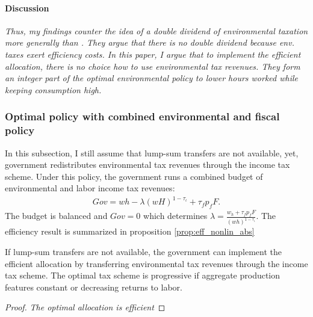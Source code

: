 \paragraph{Discussion}
\textit{Thus, my findings counter the idea of a double dividend of environmental taxation more generally than \cite{LansBovenberg1994EnvironmentalTaxation}. They argue that there is no double dividend because env. taxes exert efficiency costs. In this paper, I argue that to implement the efficient allocation, there is no choice how to use environmental tax revenues. They form an integer part of the optimal environmental policy to lower hours worked while keeping consumption high.}

\subsubsection{Optimal policy with combined environmental and fiscal policy}

In this subsection, I still assume that lump-sum transfers are not available, yet, government redistributes environmental tax revenues through the income tax scheme.
Under this policy, the government runs a combined budget of environmental and labor income tax revenues:  
\begin{align}
Gov= wh-\lambda (wH)^{1-\tau_\iota}+\tau_f p_fF.
\end{align}
The budget is balanced and $Gov = 0$ which determines $\lambda=\frac{w_h + \tau_f p_f F}{(wh)^{1-\tau_{\iota}}}$. The efficiency result is summarized in proposition \ref{prop:eff_nonlin_abs}
\begin{prop}\label{prop:eff_nonlin_abs}
	If lump-sum transfers are not available, the government can implement the efficient allocation by  transferring environmental tax revenues through the income tax scheme. The optimal tax scheme is progressive if aggregate production features constant or decreasing returns to labor.
\end{prop}

\begin{proof}\textit{The optimal allocation is efficient}
\end{proof}

